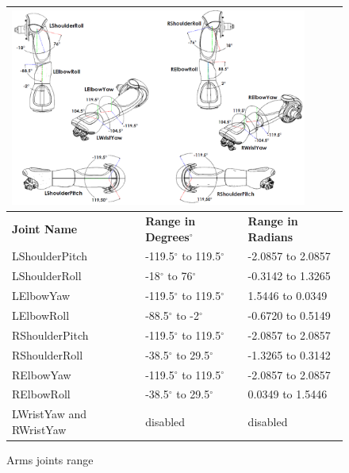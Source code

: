 \begin{figure}
\begin{tabular}{|p{5cm}|p{5cm}|p{5cm}|}
\multicolumn{3}{p{15cm}}{\centering \includegraphics[height = 6.5cm]{Figures/armsjoints.png}} \\ \hline
\textbf{Joint Name} & \textbf{Range in Degrees$^{\circ}$} & \textbf{Range in Radians} \\ \hline
LShoulderPitch & -119.5$^{\circ}$ to 119.5$^{\circ}$ & -2.0857 to 2.0857 \\ \hline
LShoulderRoll & -18$^{\circ}$ to 76$^{\circ}$ & -0.3142 to 1.3265 \\ \hline
LElbowYaw & -119.5$^{\circ}$ to 119.5$^{\circ}$ & 1.5446 to 0.0349 \\ \hline
LElbowRoll & -88.5$^{\circ}$ to -2$^{\circ}$ & -0.6720 to 0.5149 \\ \hline
RShoulderPitch & -119.5$^{\circ}$ to 119.5$^{\circ}$ & -2.0857 to 2.0857 \\ \hline
RShoulderRoll & -38.5$^{\circ}$ to 29.5$^{\circ}$ & -1.3265 to 0.3142 \\ \hline
RElbowYaw & -119.5$^{\circ}$ to 119.5$^{\circ}$ & -2.0857 to 2.0857 \\ \hline
RElbowRoll & -38.5$^{\circ}$ to 29.5$^{\circ}$ & 0.0349 to 1.5446 \\ \hline
LWristYaw and RWristYaw & disabled & disabled \\ \hline
\end{tabular}
\caption{Arms joints range}
\label{fig:ajoints}
\end{figure}

